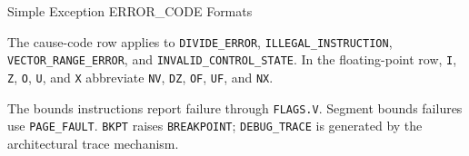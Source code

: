 \begin{manuallistedformatdiagram}{Simple Exception ERROR\_CODE Formats}
\end{manuallistedformatdiagram}
{\small
The cause-code row applies to \texttt{DIVIDE\_ERROR}, \texttt{ILLEGAL\_INSTRUCTION},
\texttt{VECTOR\_RANGE\_ERROR}, and \texttt{INVALID\_CONTROL\_STATE}. In the floating-point row, \texttt{I}, \texttt{Z},
\texttt{O}, \texttt{U}, and \texttt{X} abbreviate \texttt{NV}, \texttt{DZ},
\texttt{OF}, \texttt{UF}, and \texttt{NX}.
\par}

The bounds instructions report failure through \texttt{FLAGS.V}. Segment bounds failures use
\texttt{PAGE\_FAULT}. \texttt{BKPT} raises \texttt{BREAKPOINT}; \texttt{DEBUG\_TRACE} is generated by the
architectural trace mechanism.
